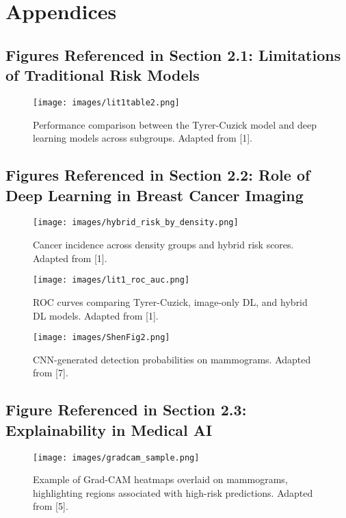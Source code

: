 \documentclass[12pt]{article}
\begin{document}
\newpage
\section{Appendices}

\subsection{Figures Referenced in Section 2.1: Limitations of Traditional Risk Models}

\begin{figure}[H]
    \centering
    \texttt{[image: images/lit1table2.png]}
    \caption{Performance comparison between the Tyrer-Cuzick model and deep learning models across subgroups. Adapted from [1].}
    \label{fig:lit1table2}
\end{figure}

\subsection{Figures Referenced in Section 2.2: Role of Deep Learning in Breast Cancer Imaging}

\begin{figure}[H]
    \centering
    \texttt{[image: images/hybrid\_risk\_by\_density.png]}
    \caption{Cancer incidence across density groups and hybrid risk scores. Adapted from [1].}
    \label{fig:hybrid_density}
\end{figure}

\begin{figure}[H]
    \centering
    \texttt{[image: images/lit1\_roc\_auc.png]}
    \caption{ROC curves comparing Tyrer-Cuzick, image-only DL, and hybrid DL models. Adapted from [1].}
    \label{fig:lit1roc}
\end{figure}

\begin{figure}[H]
    \centering
    \texttt{[image: images/ShenFig2.png]}
    \caption{CNN-generated detection probabilities on mammograms. Adapted from [7].}
    \label{fig:shen2019}
\end{figure}

\subsection{Figure Referenced in Section 2.3: Explainability in Medical AI}

\begin{figure}[H]
    \centering
    \texttt{[image: images/gradcam\_sample.png]}
    \caption{Example of Grad-CAM heatmaps overlaid on mammograms, highlighting regions associated with high-risk predictions. Adapted from [5].}
    \label{fig:gradcam}
\end{figure}
\end{document}
